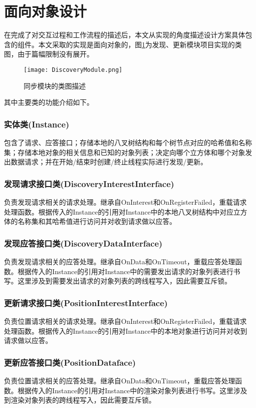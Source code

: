 \section{面向对象设计}
\setcounter{subsubsection}{0}
\par
在完成了对交互过程和工作流程的描述后，本文从实现的角度描述设计方案具体包含的组件。本文采取的实现是面向对象的，图\ref{fig:DIscoveryModuleClassDiagram}为发现、更新模块项目实现的类图，由于篇幅限制没有展开。
\begin{figure}[h!]
	\centering
	\texttt{[image: DiscoveryModule.png]}
	\caption{同步模块的类图描述}
	\label{fig:DIscoveryModuleClassDiagram}
\end{figure}
\par
其中主要类的功能介绍如下。
\subsubsection{实体类(Instance)}
包含了请求、应答接口；存储本地的八叉树结构和每个树节点对应的哈希值和名称集；存储本地对象的相关信息和已知的对象列表；决定向哪个立方体和哪个对象发出数据请求；并在开始/结束时创建/终止线程实际进行发现/更新。
\subsubsection{发现请求接口类(DiscoveryInterestInterface)}
负责发现请求相关的请求处理。继承自OnInterest和OnRegisterFailed，重载请求处理函数。根据传入的Instance的引用对Instance中的本地八叉树结构中对应立方体的名称集和其哈希值进行访问并对收到请求做以应答。
\subsubsection{发现应答接口类(DiscoveryDataInterface)}
负责发现请求相关的应答处理。继承自OnData和OnTimeout，重载应答处理函数。根据传入的Instance的引用对Instance中的需要发出请求的对象列表进行书写。这里涉及到需要发出请求的对象列表的跨线程写入，因此需要互斥锁。
\subsubsection{更新请求接口类(PositionInterestInterface)}
负责位置请求相关的请求处理。继承自OnInterest和OnRegisterFailed，重载请求处理函数。根据传入的Instance的引用对Instance中的本地对象进行访问并对收到请求做以应答。
\subsubsection{更新应答接口类(PositionDataface)}
负责位置请求相关的应答处理。继承自OnData和OnTimeout，重载应答处理函数。根据传入的Instance的引用对Instance中的渲染对象列表进行书写。这里涉及到渲染对象列表的跨线程写入，因此需要互斥锁。
